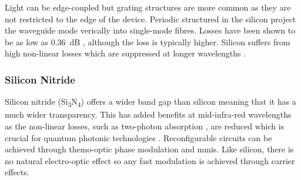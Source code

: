 Light can be edge-coupled but grating structures are more common as they are not restricted to the edge of the device. Periodic structured in the silicon project the waveguide mode verically into single-mode fibres. Losses have been shown to be as low as \SI{0.36}{dB} \cite{Notaros2016}, although the loss is typically higher. Silicon suffers from high non-linear losses which are suppressed at longer wavelengths \cite{rosenfeld2019mid}.






\subsubsection*{Silicon Nitride}

Silicon nitride (Si\textsubscript{3}N\textsubscript{4}) offers a wider band gap than silicon meaning that it has a much wider transparency. This has added benefits at mid-infra-red wavelengths as the non-linear losses, such as two-photon absorption \cite{tan2018nonlinear}, are reduced which is crucial for quantum photonic technologies \cite{lu2019chip}. Reconfigurable circuits can be achieved through themo-optic phase modulation and \acp{mmi}. Like silicon, there is no natural electro-optic effect so any fast modulation is achieved through carrier effects.

